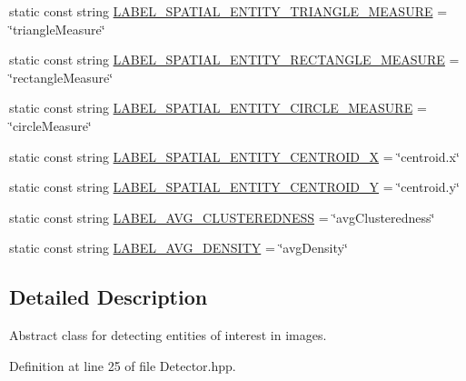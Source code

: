\begin{DoxyCompactItemize}
static const string \hyperlink{classmultiscale_1_1analysis_1_1Detector_a7776a488915b9d47f678d87161c0478f}{L\-A\-B\-E\-L\-\_\-\-S\-P\-A\-T\-I\-A\-L\-\_\-\-E\-N\-T\-I\-T\-Y\-\_\-\-T\-R\-I\-A\-N\-G\-L\-E\-\_\-\-M\-E\-A\-S\-U\-R\-E} = \char`\"{}triangle\-Measure\char`\"{}
\item 
static const string \hyperlink{classmultiscale_1_1analysis_1_1Detector_acb2040a9a63a40fa4c4ff31af9a574b5}{L\-A\-B\-E\-L\-\_\-\-S\-P\-A\-T\-I\-A\-L\-\_\-\-E\-N\-T\-I\-T\-Y\-\_\-\-R\-E\-C\-T\-A\-N\-G\-L\-E\-\_\-\-M\-E\-A\-S\-U\-R\-E} = \char`\"{}rectangle\-Measure\char`\"{}
\item 
static const string \hyperlink{classmultiscale_1_1analysis_1_1Detector_a648197e1a6962d86b2c56a6ae366038a}{L\-A\-B\-E\-L\-\_\-\-S\-P\-A\-T\-I\-A\-L\-\_\-\-E\-N\-T\-I\-T\-Y\-\_\-\-C\-I\-R\-C\-L\-E\-\_\-\-M\-E\-A\-S\-U\-R\-E} = \char`\"{}circle\-Measure\char`\"{}
\item 
static const string \hyperlink{classmultiscale_1_1analysis_1_1Detector_a76896a7d2a68a194ed5b4a8fecb85b6c}{L\-A\-B\-E\-L\-\_\-\-S\-P\-A\-T\-I\-A\-L\-\_\-\-E\-N\-T\-I\-T\-Y\-\_\-\-C\-E\-N\-T\-R\-O\-I\-D\-\_\-\-X} = \char`\"{}centroid.\-x\char`\"{}
\item 
static const string \hyperlink{classmultiscale_1_1analysis_1_1Detector_a9aff1d4b3d73d4569d21865b8f29d1c2}{L\-A\-B\-E\-L\-\_\-\-S\-P\-A\-T\-I\-A\-L\-\_\-\-E\-N\-T\-I\-T\-Y\-\_\-\-C\-E\-N\-T\-R\-O\-I\-D\-\_\-\-Y} = \char`\"{}centroid.\-y\char`\"{}
\item 
static const string \hyperlink{classmultiscale_1_1analysis_1_1Detector_aad3cf21657b51cf81d79103e485ac952}{L\-A\-B\-E\-L\-\_\-\-A\-V\-G\-\_\-\-C\-L\-U\-S\-T\-E\-R\-E\-D\-N\-E\-S\-S} = \char`\"{}avg\-Clusteredness\char`\"{}
\item 
static const string \hyperlink{classmultiscale_1_1analysis_1_1Detector_ae3607276ce985a3121088c2611c8bd75}{L\-A\-B\-E\-L\-\_\-\-A\-V\-G\-\_\-\-D\-E\-N\-S\-I\-T\-Y} = \char`\"{}avg\-Density\char`\"{}
\end{DoxyCompactItemize}


\subsection{Detailed Description}
Abstract class for detecting entities of interest in images. 

Definition at line 25 of file Detector.\-hpp.



